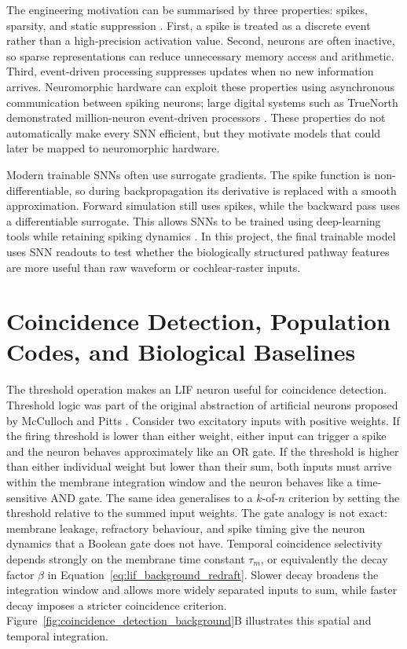 The engineering motivation can be summarised by three properties: spikes, sparsity, and static suppression \cite{Eshraghian2023TRAININGLEARNING}. First, a spike is treated as a discrete event rather than a high-precision activation value. Second, neurons are often inactive, so sparse representations can reduce unnecessary memory access and arithmetic. Third, event-driven processing suppresses updates when no new information arrives. Neuromorphic hardware can exploit these properties using asynchronous communication between spiking neurons; large digital systems such as TrueNorth demonstrated million-neuron event-driven processors \cite{Merolla2014AInterface}. These properties do not automatically make every SNN efficient, but they motivate models that could later be mapped to neuromorphic hardware.

Modern trainable SNNs often use surrogate gradients. The spike function is non-differentiable, so during backpropagation its derivative is replaced with a smooth approximation. Forward simulation still uses spikes, while the backward pass uses a differentiable surrogate. This allows SNNs to be trained using deep-learning tools while retaining spiking dynamics \cite{Eshraghian2023TRAININGLEARNING}. In this project, the final trainable model uses SNN readouts to test whether the biologically structured pathway features are more useful than raw waveform or cochlear-raster inputs.

\section{Coincidence Detection, Population Codes, and Biological Baselines}
\label{sec:coincidence_background}

The threshold operation makes an LIF neuron useful for coincidence detection. Threshold logic was part of the original abstraction of artificial neurons proposed by McCulloch and Pitts \cite{Mcculloch1990AN}. Consider two excitatory inputs with positive weights. If the firing threshold is lower than either weight, either input can trigger a spike and the neuron behaves approximately like an OR gate. If the threshold is higher than either individual weight but lower than their sum, both inputs must arrive within the membrane integration window and the neuron behaves like a time-sensitive AND gate. The same idea generalises to a $k$-of-$n$ criterion by setting the threshold relative to the summed input weights. The gate analogy is not exact: membrane leakage, refractory behaviour, and spike timing give the neuron dynamics that a Boolean gate does not have. Temporal coincidence selectivity depends strongly on the membrane time constant $\tau_m$, or equivalently the decay factor $\beta$ in Equation~\ref{eq:lif_background_redraft}. Slower decay broadens the integration window and allows more widely separated inputs to sum, while faster decay imposes a stricter coincidence criterion. Figure~\ref{fig:coincidence_detection_background}B illustrates this spatial and temporal integration.

